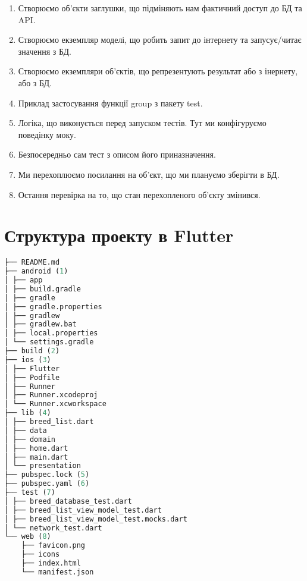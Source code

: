 \begin{enumerate}
    \item Створюємо об'єкти заглушки, що підміняють нам фактичний доступ до БД та API.
    \item Створюємо екземпляр моделі, що робить запит до інтернету та запусує/читає значення з БД.
    \item Створюємо екземпляри об'єктів, що репрезентують результат або з інернету, або з БД.
    \item Приклад застосування функції group з пакету test.
    \item Логіка, що виконується перед запуском тестів. Тут ми конфігуруємо поведінку моку.
    \item Безпосередньо сам тест з описом його приназначення.
    \item Ми перехоплюємо посилання на об'єкт, що ми плануємо зберігти в БД.
    \item Остання перевірка на то, що стан перехопленого об'єкту змінився.
\end{enumerate}


\section{Структура проекту в Flutter}
\label{section.2.7}

\begin{lstlisting}[style=light, language=Python,label={lst:flutter_project_layout},caption=Flutter Project Layout]
├── README.md
├── android (1)
│ ├── app
│ ├── build.gradle
│ ├── gradle
│ ├── gradle.properties
│ ├── gradlew
│ ├── gradlew.bat
│ ├── local.properties
│ └── settings.gradle
├── build (2)
├── ios (3)
│ ├── Flutter
│ ├── Podfile
│ ├── Runner
│ ├── Runner.xcodeproj
│ └── Runner.xcworkspace
├── lib (4)
│ ├── breed_list.dart
│ ├── data
│ ├── domain
│ ├── home.dart
│ ├── main.dart
│ └── presentation
├── pubspec.lock (5)
├── pubspec.yaml (6)
├── test (7)
│ ├── breed_database_test.dart
│ ├── breed_list_view_model_test.dart
│ ├── breed_list_view_model_test.mocks.dart
│ └── network_test.dart
└── web (8)
    ├── favicon.png
    ├── icons
    ├── index.html
    └── manifest.json
\end{lstlisting}

